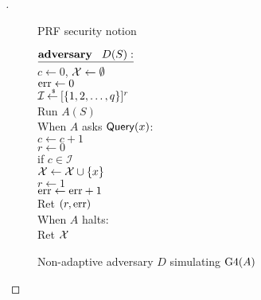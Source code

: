 \begin{proof}[]
\begin{figure}
\centering
{}
\caption{PRF security notion}\label{fig:prf}
\end{figure}


\begin{figure}
\centering
{}
{
${\underline{\textbf{adversary}\hspace*{2ex} {D(S)}:}}$\\[4pt]
$c \gets 0$, ${\cal X} \gets \emptyset$\\
$\mathrm{err} \gets 0$\\
$\mathcal{I}{\:\stackrel{{\scriptscriptstyle \hspace{0.2em}\$}} {\leftarrow}\:} [\{1,2,\ldots,q\}]^r$\\
Run $A(S)$\\
When $A$ asks $\mathsf{Query}(x)$:\\
\nudge $c \gets c+1$\\
\nudge $r \gets 0$\\
\nudge if $c \in \mathcal{I}$\\
\nudge \nudge ${\cal X} \gets {\cal X} \cup \{x\}$\\
\nudge \nudge $r \gets 1$\\
\nudge \nudge $\mathrm{err} \gets \mathrm{err} + 1$\\
\nudge Ret $(r,\mathrm{err} )$\\
When $A$ halts:\\
\nudge Ret ${\cal X}$
}
\caption{Non-adaptive adversary $D$ simulating $\text{G4}(A)$} \label{fig:D}
\end{figure}	



\end{proof}
